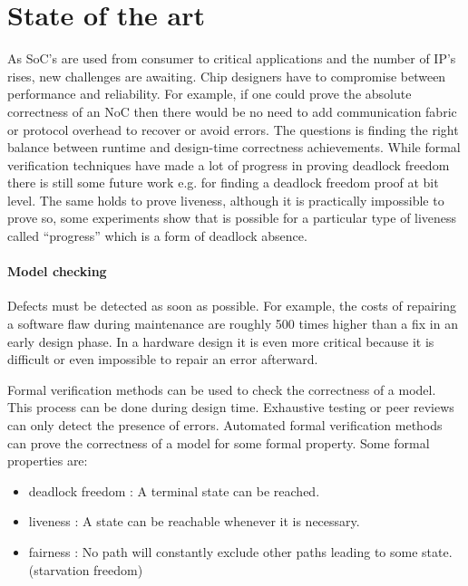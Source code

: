 \section{State of the art}

As SoC's are used from consumer to critical applications and the number of IP's
rises, new challenges are awaiting. Chip designers have to compromise between
performance and reliability. For example, if one could prove the absolute
correctness of an NoC then there would be no need to add communication fabric or
protocol overhead to recover or avoid errors. The questions is finding the right
balance between runtime and design-time correctness achievements. While formal
verification techniques have made a lot of progress in proving deadlock freedom
there is still some future work e.g. for finding a deadlock freedom proof at bit
level. The same holds to prove liveness, although it is practically impossible to
prove so, some experiments show that is possible for a particular type of
liveness called ``progress'' which is a form of deadlock absence.
\cite{Ray:2012:SPV:2492708.2492936,itp}


\paragraph{Model checking}\cite{baier2008principles}

Defects must be detected as soon as possible. For example, the costs of repairing
a software flaw during maintenance are roughly 500 times higher than a fix in an
early design phase. In a hardware design it is even more critical because it is
difficult or even impossible to repair an error afterward.

Formal verification methods can be used to check the correctness of a model.
This process can be done during design time. Exhaustive testing or peer reviews
can only detect the presence of errors. Automated formal verification methods
can prove the correctness of a model for some formal property.
Some formal properties are:

\begin{itemize}
\item deadlock freedom : A terminal state can be reached.
\item liveness : A state can be reachable whenever it is necessary.
\item fairness : No path will constantly exclude other paths leading to some
state. (starvation freedom)
\end{itemize} 

